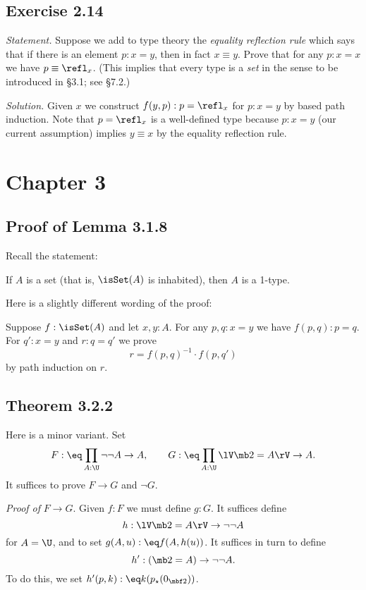 \documentclass[12pt]{article}
\begin{document}

\subsection{Exercise 2.14}

\emph{Statement.} Suppose we add to type theory the \emph{equality reflection rule} which says that if there is an element $p:x=y$, then in fact $x\equiv y$. Prove that for any $p:x=x$ we have $p\equiv\refl_x$. (This implies that every type is a \emph{set} in the sense to be introduced in \S3.1; see \S7.2.)

\nn\emph{Solution.} Given $x$ we construct $f(y,p):p=\refl_x$ for $p:x=y$ by based path induction. Note that $p=\refl_x$ is a well-defined type because $p:x=y$ (our current assumption) implies $y\equiv x$ by the equality reflection rule.


\section{Chapter 3}

\subsection{Proof of Lemma 3.1.8}\label{318}

Recall the statement: 

If $A$ is a set (that is, $\isSet(A)$ is inhabited), then $A$ is a 1-type. 

Here is a slightly different wording of the proof:

Suppose $f:\isSet(A)$ and let $x,y:A$. For any $p,q:x=y$ we have $f(p,q):p=q$. For $q':x=y$ and $r:q=q'$ we prove 
$$
r=f(p,q)^{-1}\cdot f(p,q')
$$ 
by path induction on $r$.


\subsection{Theorem 3.2.2} 

Here is a minor variant. Set 
$$
F:\eq\prod_{A:\U}\neg\neg A\to A,\qquad G:\eq\prod_{A:\U}\lV\mb2=A\rV\to A.
$$ 
It suffices to prove $F\to G$ and $\neg G$. 

\emph{Proof of} $F\to G$. Given $f:F$ we must define $g:G$. It suffices define 
$$
h:\lV\mb2=A\rV\to\neg\neg A
$$ 
for $A=\U$, and to set $g(A,u):\eq f(A,h(u))$. It suffices in turn to define 
$$
h':(\mb2=A)\to\neg\neg A.
$$ 
To do this, we set $h'(p,k):\eq k(p_\star(0_{\mbf2}))$. 
\end{document}
